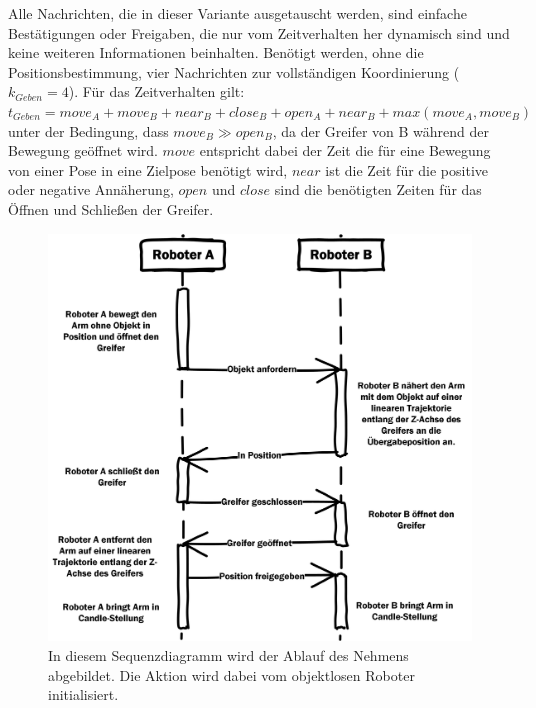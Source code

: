 Alle Nachrichten, die in dieser Variante ausgetauscht werden, sind einfache Bestätigungen oder Freigaben, die nur vom Zeitverhalten her dynamisch sind und keine weiteren Informationen beinhalten. Benötigt werden, ohne die Positionsbestimmung, vier Nachrichten zur vollständigen Koordinierung ($k_{Geben} = 4$). Für das Zeitverhalten gilt: $t_{Geben} = move_A + move_B + near_B + close_B + open_A + near_B + max(move_A, move_B)$ unter der Bedingung, dass $move_B \gg open_B$, da der Greifer von B während der Bewegung geöffnet wird. $move$ entspricht dabei der Zeit die für eine Bewegung von einer Pose in eine Zielpose benötigt wird, $near$ ist die Zeit für die positive oder negative Annäherung, $open$ und $close$ sind die benötigten Zeiten für das Öffnen und Schließen der Greifer.

\begin{figure}
		\centering
	\includegraphics[scale=1.0]{fig/SeqTake}

\caption[Sequenzdiagramm Nehmen]{In diesem Sequenzdiagramm wird der Ablauf des Nehmens abgebildet. Die Aktion wird dabei vom objektlosen Roboter initialisiert.}
	\label{fig:gripper2}
\end{figure}

